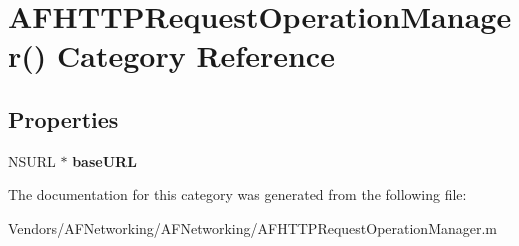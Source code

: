 \hypertarget{category_a_f_h_t_t_p_request_operation_manager_07_08}{}\section{A\+F\+H\+T\+T\+P\+Request\+Operation\+Manager() Category Reference}
\label{category_a_f_h_t_t_p_request_operation_manager_07_08}
\subsection*{Properties}
\begin{DoxyCompactItemize}
\item 
\hypertarget{category_a_f_h_t_t_p_request_operation_manager_07_08_aab6e8a8836eead90575a417cd706c1b0}{}N\+S\+U\+R\+L $\ast$ {\bfseries base\+U\+R\+L}\label{category_a_f_h_t_t_p_request_operation_manager_07_08_aab6e8a8836eead90575a417cd706c1b0}

\end{DoxyCompactItemize}


The documentation for this category was generated from the following file\+:\begin{DoxyCompactItemize}
\item 
Vendors/\+A\+F\+Networking/\+A\+F\+Networking/A\+F\+H\+T\+T\+P\+Request\+Operation\+Manager.\+m\end{DoxyCompactItemize}
